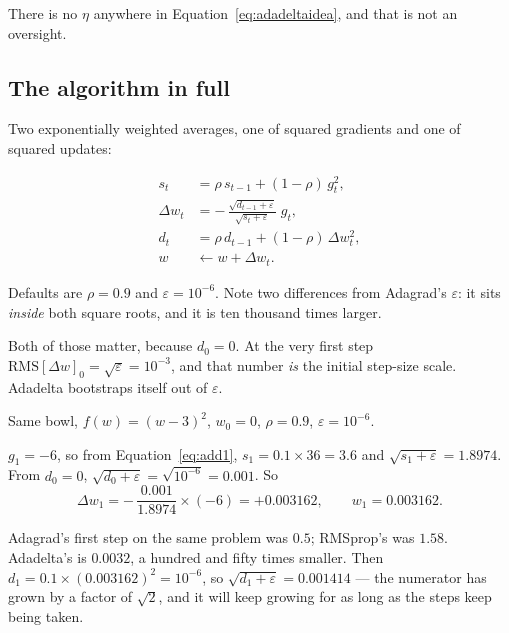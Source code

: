\documentclass[11pt]{article}
\begin{document}
There is no $\eta$ anywhere in Equation~\eqref{eq:adadeltaidea}, and that is not
an oversight.

\subsection{The algorithm in full}

Two exponentially weighted averages, one of squared gradients and one of
squared updates:

\begin{align}
  s_t        &= \rho\, s_{t-1} + (1-\rho)\, g_t^2, \label{eq:add1}\\[2pt]
  \Delta w_t &= -\,\frac{\sqrt{d_{t-1} + \varepsilon}}
                        {\sqrt{s_t + \varepsilon}}\; g_t, \label{eq:add2}\\[2pt]
  d_t        &= \rho\, d_{t-1} + (1-\rho)\, \Delta w_t^2, \label{eq:add3}\\[2pt]
  w          &\leftarrow w + \Delta w_t . \label{eq:add4}
\end{align}

Defaults are $\rho = 0.9$ and $\varepsilon = 10^{-6}$. Note two differences
from Adagrad's $\varepsilon$: it sits \emph{inside} both square roots, and it is
ten thousand times larger.

Both of those matter, because $d_0 = 0$. At the very first step
$\mathrm{RMS}[\Delta w]_0 = \sqrt{\varepsilon} = 10^{-3}$, and that number
\emph{is} the initial step-size scale. Adadelta bootstraps itself out of
$\varepsilon$.

\begin{worked}
Same bowl, $f(w) = (w-3)^2$, $w_0 = 0$, $\rho = 0.9$, $\varepsilon = 10^{-6}$.

$g_1 = -6$, so from Equation~\eqref{eq:add1},
$s_1 = 0.1 \times 36 = 3.6$ and $\sqrt{s_1 + \varepsilon} = 1.8974$.
From $d_0 = 0$, $\sqrt{d_0 + \varepsilon} = \sqrt{10^{-6}} = 0.001$. So
\[
  \Delta w_1 = -\,\frac{0.001}{1.8974}\times(-6) = +0.003162,
  \qquad w_1 = 0.003162 .
\]

Adagrad's first step on the same problem was $0.5$; RMSprop's was $1.58$.
Adadelta's is $0.0032$, a hundred and fifty times smaller. Then
$d_1 = 0.1 \times (0.003162)^2 = 10^{-6}$, so
$\sqrt{d_1 + \varepsilon} = 0.001414$ --- the numerator has grown by a factor of
$\sqrt{2}$, and it will keep growing for as long as the steps keep being taken.
\end{worked}
\end{document}
